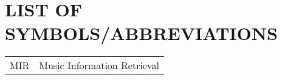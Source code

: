\newpage
\section*{\fontsize{14pt}{0pt}\bfseries LIST OF SYMBOLS/ABBREVIATIONS}
\begin{longtable}[l]{p{50pt} p{200pt}}
    MIR & Music Information Retrieval  \\
\end{longtable}
